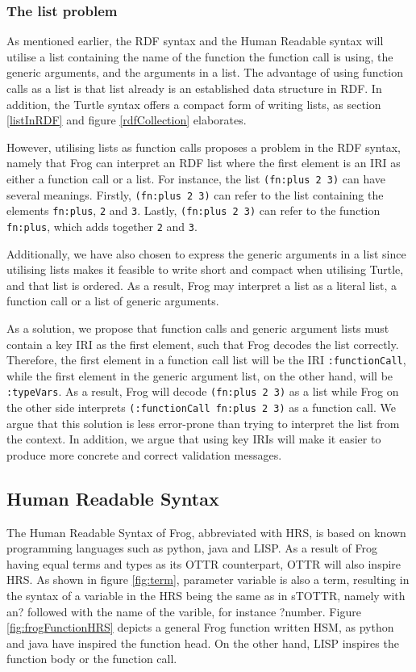 \subsubsection{The list problem}
\label{theListProblem}
As mentioned earlier, the RDF syntax and the Human Readable syntax will utilise a list containing the name of the function the function call is using, the generic arguments, and the arguments in a list. The advantage of using function calls as a list is that list already is an established data structure in RDF. In addition, the Turtle syntax offers a compact form of writing lists, as section \ref{listInRDF} and figure \ref{rdfCollection} elaborates. 

\para
However, utilising lists as function calls proposes a problem in the RDF syntax, namely that Frog can interpret an RDF list where the first element is an IRI as either a function call or a list. For instance, the list \lstinline{(fn:plus 2 3)} can have several meanings. Firstly, \lstinline{(fn:plus 2 3)} can refer to the list containing the elements \lstinline{fn:plus}, \lstinline{2} and \lstinline{3}. Lastly, \lstinline{(fn:plus 2 3)} can refer to the function \lstinline{fn:plus}, which adds together \lstinline{2} and \lstinline{3}.

\para
Additionally, we have also chosen to express the generic arguments in a list since utilising lists makes it feasible to write short and compact when utilising Turtle, and that list is ordered. As a result, Frog may interpret a list as a literal list, a function call or a list of generic arguments.

\para
As a solution, we propose that function calls and generic argument lists must contain a key IRI as the first element, such that Frog decodes the list correctly. Therefore, the first element in a function call list will be the IRI \lstinline{:functionCall}, while the first element in the generic argument list, on the other hand, will be \lstinline{:typeVars}. As a result, Frog will decode \lstinline{(fn:plus 2 3)} as a list while Frog on the other side interprets \lstinline{(:functionCall fn:plus 2 3)} as a function call. We argue that this solution is less error-prone than trying to interpret the list from the context. In addition, we argue that using key IRIs will make it easier to produce more concrete and correct validation messages. 

\subsection{Human Readable Syntax}
The Human Readable Syntax of Frog, abbreviated with HRS, is based on known programming languages such as python, java and LISP. As a result of Frog having equal terms and types as its OTTR counterpart, OTTR will also inspire HRS. As shown in figure \ref{fig:term}, parameter variable is also a term, resulting in the syntax of a variable in the HRS being the same as in sTOTTR, namely with an? followed with the name of the varible, for instance ?number.  Figure \ref{fig:frogFunctionHRS} depicts a general Frog function written HSM, as python and java have inspired the function head. On the other hand, LISP inspires the function body or the function call. 

